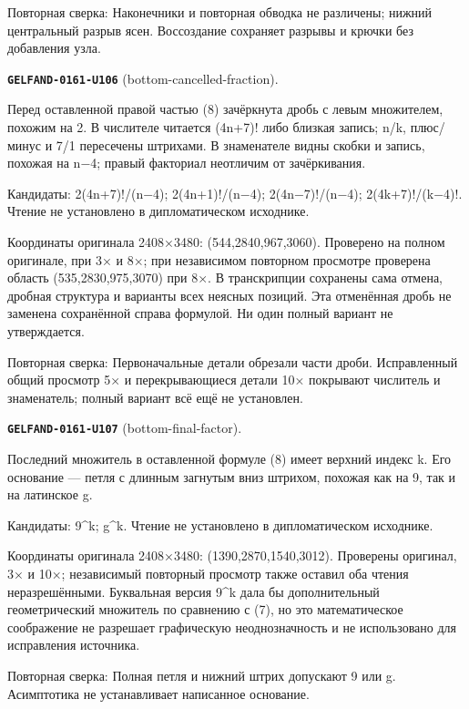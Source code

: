 Повторная сверка: Наконечники и повторная обводка не различены; нижний центральный разрыв ясен. Воссоздание сохраняет разрывы и крючки без добавления узла.\par\medskip
\par\noindent\leavevmode{}\label{GELFAND-0161-U106}\label{GELFAND-P001487:bottom-cancelled-fraction}\textbf{\texttt{GELFAND-0161-U106}} (bottom-cancelled-fraction).\nopagebreak[4]\par
Перед оставленной правой частью (8) зачёркнута дробь с левым множителем, похожим на 2. В числителе читается (4n+7)! либо близкая запись; n/k, плюс/минус и 7/1 пересечены штрихами. В знаменателе видны скобки и запись, похожая на n−4; правый факториал неотличим от зачёркивания.\par
Кандидаты: 2(4n+7)!/(n−4); 2(4n+1)!/(n−4); 2(4n−7)!/(n−4); 2(4k+7)!/(k−4)!. Чтение не установлено в дипломатическом исходнике.\par
Координаты оригинала 2408×3480: (544,2840,967,3060). Проверено на полном оригинале, при 3× и 8×; при независимом повторном просмотре проверена область (535,2830,975,3070) при 8×. В транскрипции сохранены сама отмена, дробная структура и варианты всех неясных позиций. Эта отменённая дробь не заменена сохранённой справа формулой. Ни один полный вариант не утверждается.\par
Повторная сверка: Первоначальные детали обрезали части дроби. Исправленный общий просмотр 5× и перекрывающиеся детали 10× покрывают числитель и знаменатель; полный вариант всё ещё не установлен.\par\medskip
\par\noindent\leavevmode{}\label{GELFAND-0161-U107}\label{GELFAND-P001487:bottom-final-factor}\textbf{\texttt{GELFAND-0161-U107}} (bottom-final-factor).\nopagebreak[4]\par
Последний множитель в оставленной формуле (8) имеет верхний индекс k. Его основание — петля с длинным загнутым вниз штрихом, похожая как на 9, так и на латинское g.\par
Кандидаты: 9\textasciicircum{}k; g\textasciicircum{}k. Чтение не установлено в дипломатическом исходнике.\par
Координаты оригинала 2408×3480: (1390,2870,1540,3012). Проверены оригинал, 3× и 10×; независимый повторный просмотр также оставил оба чтения неразрешёнными. Буквальная версия 9\textasciicircum{}k дала бы дополнительный геометрический множитель по сравнению с (7), но это математическое соображение не разрешает графическую неоднозначность и не использовано для исправления источника.\par
Повторная сверка: Полная петля и нижний штрих допускают 9 или g. Асимптотика не устанавливает написанное основание.\par\medskip
